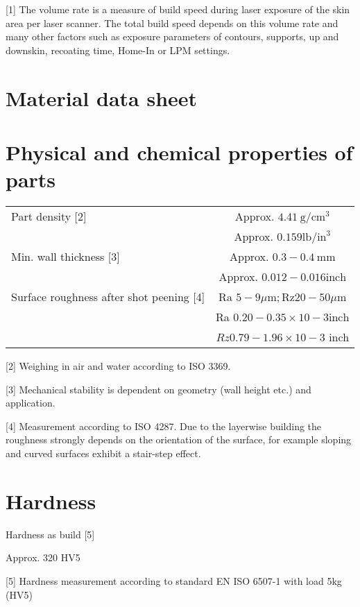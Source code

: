 \documentclass[10pt]{article}
\begin{document}
[1] The volume rate is a measure of build speed during laser exposure of the skin area per laser scanner. The total build speed depends on this volume rate and many other factors such as exposure parameters of contours, supports, up and downskin, recoating time, Home-In or LPM settings.

\section*{Material data sheet}
\section*{Physical and chemical properties of parts}
\begin{center}
\begin{tabular}{lc}
\hline
Part density [2] & Approx. $4.41 \mathrm{~g} / \mathrm{cm}^{3}$ \\
 & Approx. $0.159 \mathrm{lb} / \mathrm{in}^{3}$ \\
\hline
Min. wall thickness [3] & Approx. $0.3-0.4 \mathrm{~mm}$ \\
 & Approx. $0.012-0.016 \mathrm{inch}$ \\
\hline
Surface roughness after shot peening [4] & Ra $5-9 \mu \mathrm{m} ; \mathrm{Rz} 20-50 \mu \mathrm{m}$ \\
 & Ra $0.20-0.35 \times 10-3 \mathrm{inch}$ \\
 & $R z 0.79-1.96 \times 10-3$ inch \\
\hline
\end{tabular}
\end{center}

[2] Weighing in air and water according to ISO 3369.

[3] Mechanical stability is dependent on geometry (wall height etc.) and application.

[4] Measurement according to ISO 4287. Due to the layerwise building the roughness strongly depends on the orientation of the surface, for example sloping and curved surfaces exhibit a stair-step effect.

\section*{Hardness}
Hardness as build [5]

Approx. 320 HV5

[5] Hardness measurement according to standard EN ISO 6507-1 with load 5kg (HV5)
\end{document}
